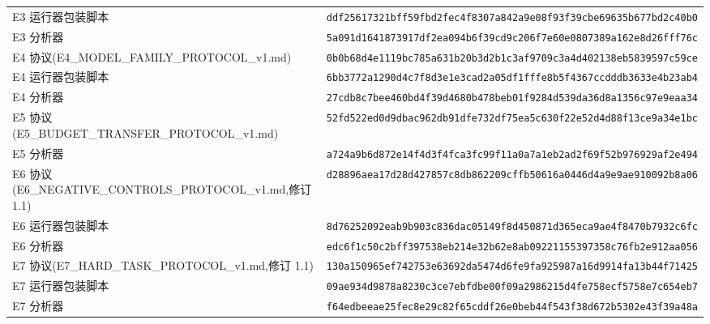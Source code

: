 \documentclass[11pt,a4paper]{ctexart}
\begin{document}
\begin{center}
{\begin{tabular}{ll}
E3 运行器包装脚本 & \texttt{ddf25617321bff59fbd2fec4f8307a842a9e08f93f39cbe69635b677bd2c40b0} \\
E3 分析器 & \texttt{5a091d1641873917df2ea094b6f39cd9c206f7e60e0807389a162e8d26fff76c} \\
E4 协议(E4\_MODEL\_FAMILY\_PROTOCOL\_v1.md) & \texttt{0b0b68d4e1119bc785a631b20b3d2b1c3af9709c3a4d402138eb5839597c59ce} \\
E4 运行器包装脚本 & \texttt{6bb3772a1290d4c7f8d3e1e3cad2a05df1fffe8b5f4367ccdddb3633e4b23ab4} \\
E4 分析器 & \texttt{27cdb8c7bee460bd4f39d4680b478beb01f9284d539da36d8a1356c97e9eaa34} \\
E5 协议(E5\_BUDGET\_TRANSFER\_PROTOCOL\_v1.md) & \texttt{52fd522ed0d9dbac962db91dfe732df75ea5c630f22e52d4d88f13ce9a34e1bc} \\
E5 分析器 & \texttt{a724a9b6d872e14f4d3f4fca3fc99f11a0a7a1eb2ad2f69f52b976929af2e494} \\
E6 协议(E6\_NEGATIVE\_CONTROLS\_PROTOCOL\_v1.md,修订 1.1) & \texttt{d28896aea17d28d427857c8db862209cffb50616a0446d4a9e9ae910092b8a06} \\
E6 运行器包装脚本 & \texttt{8d76252092eab9b903c836dac05149f8d450871d365eca9ae4f8470b7932c6fc} \\
E6 分析器 & \texttt{edc6f1c50c2bff397538eb214e32b62e8ab09221155397358c76fb2e912aa056} \\
E7 协议(E7\_HARD\_TASK\_PROTOCOL\_v1.md,修订 1.1) & \texttt{130a150965ef742753e63692da5474d6fe9fa925987a16d9914fa13b44f71425} \\
E7 运行器包装脚本 & \texttt{09ae934d9878a8230c3ce7ebfdbe00f09a2986215d4fe758ecf5758e7c654eb7} \\
E7 分析器 & \texttt{f64edbeeae25fec8e29c82f65cddf26e0beb44f543f38d672b5302e43f39a48a} \\
\bottomrule
\end{tabular}}
\end{center}
\end{document}
